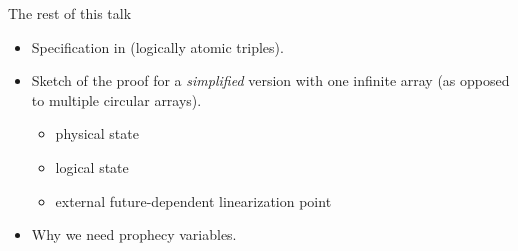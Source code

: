 \begin{frame}{The rest of this talk}
\begin{itemize}
	\setlength\itemsep{1em}
	\item Specification in \Iris (logically atomic triples).
	\item Sketch of the proof for a \emph{simplified} version with one infinite array (as opposed to multiple circular arrays).
		\begin{itemize}
			\item physical state
			\item logical state
			\item external future-dependent linearization point
		\end{itemize}
	\item Why we need prophecy variables.
\end{itemize}
\end{frame}